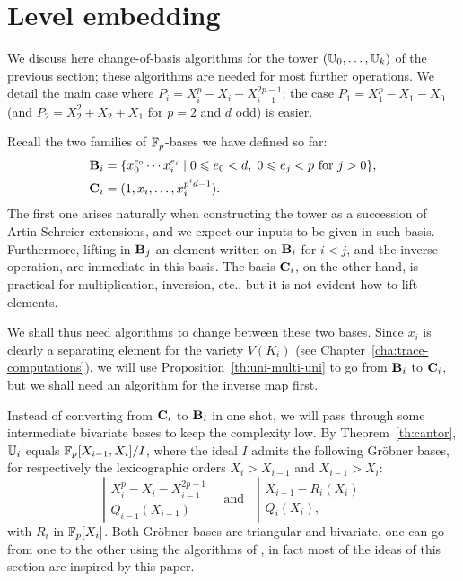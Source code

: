 \section{Level embedding}
\label{sec:level-embedding}

We discuss here change-of-basis algorithms for the tower $(\mathbb{U}_0,
\ldots, \mathbb{U}_k)$ of the previous section; these algorithms are needed
for most further operations. We detail the main case where $P_i =
X_i^p - X_i - X_{i-1}^{2p-1}$; the case $P_1= X_1^p - X_1 - X_0$ (and
$P_2=X_2^2+X_2+X_1$ for $p=2$ and $d$ odd) is easier.

Recall the two families of $\mathbb{F}_p$-bases we have defined so far:
\begin{align}
  \label{eq:58}
  \mathbf{B}_i &=
  \{x_0^{e_0} \cdots x_i^{e_i} \;|\; 0 \leqslant e_0 < d,\; 0\leqslant e_j < p 
  \text{ for $j>0$}\}
  \text{,}\\
  \label{eq:60}
  \mathbf{C}_i &=(1,x_i,\dots,x_i^{p^id-1})
  \text{.}  
\end{align}
The first one arises naturally when constructing the tower as a
succession of Artin-Schreier extensions, and we expect our inputs to
be given in such basis. Furthermore, lifting in $\mathbf{B}_j$ an
element written on $\mathbf{B}_i$ for $i<j$, and the inverse operation,
are immediate in this basis. The basis $\mathbf{C}_i$, on the other
hand, is practical for multiplication, inversion, etc., but it is not
evident how to lift elements.

We shall thus need algorithms to change between these two bases. Since
$x_i$ is clearly a separating element for the variety $V(K_i)$ (see
Chapter~\ref{cha:trace-computations}), we will use
Proposition~\ref{th:uni-multi-uni} to go from $\mathbf{B}_i$ to
$\mathbf{C}_i$, but we shall need an algorithm for the inverse map first.

Instead of converting from $\mathbf{C}_i$ to $\mathbf{B}_i$ in one shot,
we will pass through some intermediate bivariate bases to keep the
complexity low. By Theorem~\ref{th:cantor}, $\mathbb{U}_i$ equals
$\mathbb{F}_p[X_{i-1},X_i]/I$, where the ideal $I$ admits the following
Gr{\"o}bner bases, for respectively the lexicographic orders
$X_i>X_{i-1}$ and $X_{i-1}>X_i$:
\begin{equation*}
  \left |
  \begin{array}{rl}
    X_i^p - X_i - X_{i-1}^{2p-1} \\
    Q_{i-1}(X_{i-1})         
  \end{array}
\right.
  \quad \text{and}\quad
  \left |
  \begin{array}{rl}
    X_{i-1} - R_i(X_i) \\
    Q_i(X_i),
  \end{array}
\right.
\end{equation*}
with $R_i$ in $\mathbb{F}_p[X_i]$. Both Gröbner bases are triangular and
bivariate, one can go from one to the other using the algorithms of
\cite{pascal+schost06}, in fact most of the ideas of this section are
inspired by this paper.


